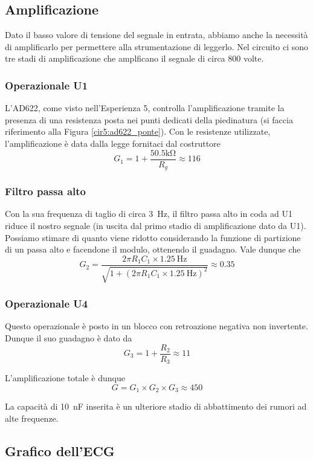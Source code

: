 \subsection{Amplificazione}

Dato il basso valore di tensione del segnale in entrata, abbiamo anche la necessità di amplificarlo per permettere alla strumentazione di leggerlo. Nel circuito ci sono tre stadi di amplificazione che amplficano il segnale di circa 800 volte.

\subsubsection*{Operazionale U1}
L'AD622, come visto nell'Esperienza 5, controlla l'amplificazione tramite la presenza di una resistenza posta nei punti dedicati della piedinatura (si faccia riferimento alla Figura \ref{cir5:ad622_ponte}). Con le resistenze utilizzate, l'amplificazione è data dalla legge  fornitaci dal costruttore
$$G_1=1+\frac{50.5 \si{\kilo\ohm}}{R_g} \approx 116$$

\subsubsection*{Filtro passa alto}
Con la sua frequenza di taglio di circa \SI{3}{\Hz}, il filtro passa alto in coda ad U1 riduce il nostro segnale (in uscita dal primo stadio di amplificazione dato da U1). Possiamo stimare di quanto viene ridotto considerando la funzione di partizione di un passa alto e facendone il modulo, ottenendo il guadagno. Vale dunque che
$$G_2=\frac{2 \pi R_1 C_1 \times \SI{1.25}{\Hz}}{\sqrt{1+(2 \pi R_1 C_1 \times \SI{1.25}{\Hz})^2}}\approx 0.35$$

\subsubsection*{Operazionale U4}
Questo operazionale è posto in un blocco con retroazione negativa non invertente. Dunque il suo guadagno è dato da
$$G_3=1+\frac{R_2}{R_3} \approx 11$$

L'amplificazione totale è dunque
$$G = G_1 \times G_2 \times G_3 \approx 450$$

La capacità di \SI{10}{\nano\farad} inserita è un ulteriore stadio di abbattimento dei rumori ad alte frequenze.

\subsection{Grafico dell'ECG}

